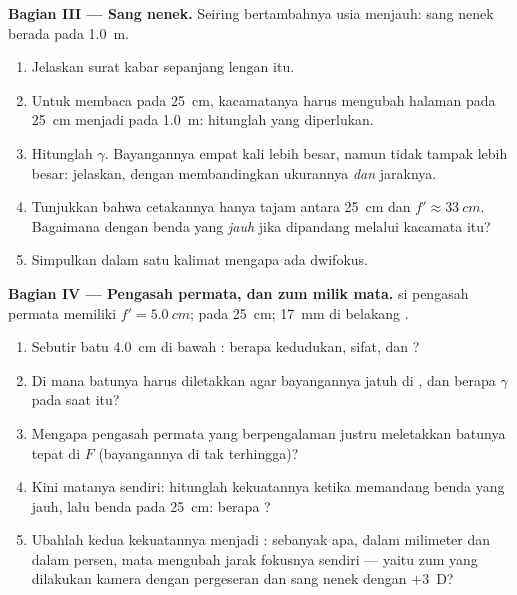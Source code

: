 \begin{problem}
\medskip
\noindent\textbf{Bagian III --- Sang nenek.}
Seiring bertambahnya usia  menjauh:  sang nenek
berada pada \qty{1.0}{m}.
\begin{enumerate}[resume]
  \item Jelaskan surat kabar sepanjang lengan itu.
  \item Untuk membaca pada \qty{25}{cm}, kacamatanya harus mengubah
        halaman pada \qty{25}{cm} menjadi  pada
        \qty{1.0}{m}: hitunglah  yang diperlukan.
  \item Hitunglah $\gamma$. Bayangannya empat kali lebih besar, namun
        tidak tampak lebih besar: jelaskan, dengan membandingkan
        ukurannya \emph{dan} jaraknya.
  \item Tunjukkan bahwa cetakannya hanya tajam antara \qty{25}{cm} dan
        $f' \approx \qty{33}{cm}$. Bagaimana dengan benda yang
        \emph{jauh} jika dipandang melalui kacamata itu?
  \item Simpulkan dalam satu kalimat mengapa ada  dwifokus.
\end{enumerate}

\medskip
\noindent\textbf{Bagian IV --- Pengasah permata, dan zum milik mata.}
 si pengasah permata memiliki $f' = \qty{5.0}{cm}$; 
pada \qty{25}{cm};  \qty{17}{mm} di belakang .
\begin{enumerate}[resume]
  \item Sebutir batu \qty{4.0}{cm} di bawah : berapa kedudukan,
        sifat, dan ?
  \item Di mana batunya harus diletakkan agar bayangannya jatuh di
        , dan berapa $\gamma$ pada saat itu?
  \item Mengapa pengasah permata yang berpengalaman justru meletakkan
        batunya tepat di $F$ (bayangannya di tak terhingga)?
  \item Kini matanya sendiri: hitunglah kekuatannya ketika memandang
        benda yang jauh, lalu benda pada \qty{25}{cm}: berapa 
        ?
  \item Ubahlah kedua kekuatannya menjadi : sebanyak apa,
        dalam milimeter dan dalam persen, mata mengubah jarak fokusnya
        sendiri --- yaitu zum yang dilakukan kamera dengan pergeseran
        dan sang nenek dengan $+3$~D?
\end{enumerate}
\end{problem}
